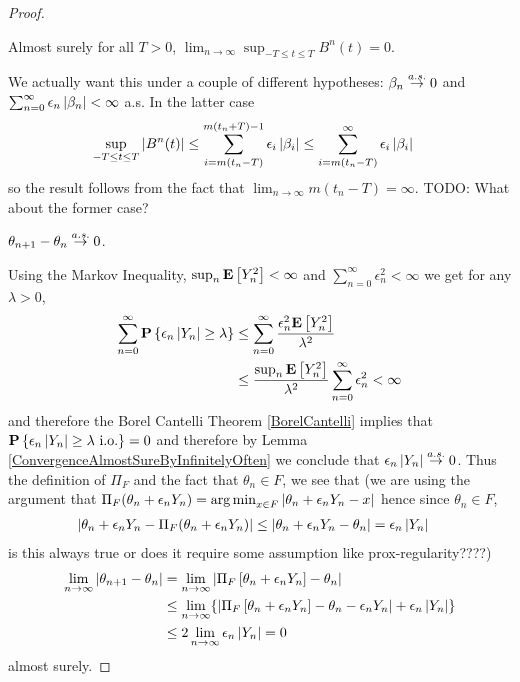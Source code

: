 \begin{proof}
\begin{clm}Almost surely for all $T > 0$, $\lim_{n \to \infty} \sup_{-T \leq t \leq T} B^n(t) = 0$.
\end{clm}

We actually want this under a couple of different hypotheses: $\beta_n \overset{a.s.}\to 0$ and $\sum_{n=0}^\infty \epsilon_n \left \vert \beta_n \right \vert < \infty$ a.s.  In the latter case 
\begin{align*}
\sup_{-T \leq t \leq T} \left \vert B^n(t) \right \vert &\leq \sum_{i=m(t_n -T)}^{m(t_n+T) -1} \epsilon_i \left \vert \beta_i \right \vert \leq \sum_{i=m(t_n -T)}^{\infty} \epsilon_i \left \vert \beta_i \right \vert 
\end{align*}
so the result follows from the fact that $\lim_{n \to \infty} m(t_n -T) = \infty$.  TODO: What about the former case?

\begin{clm}$\theta_{n+1} - \theta_n \overset{a.s.}\to 0$.
\end{clm}
Using the Markov Inequality, $\sup_n \textbf{E}\left[Y_n^2\right] < \infty$ and $\sum_{n=0}^\infty \epsilon_n^2 <\infty$ we get for any $\lambda > 0$,
\begin{align*}
\sum_{n=0}^\infty \textbf{P}\left \{\epsilon_n \left \vert Y_n \right \vert \geq \lambda \right \} &\leq 
\sum_{n=0}^\infty \frac{\epsilon_n^2 \textbf{E}\left[Y_n^2\right]}{\lambda^2} \\
&\leq \frac{\sup_n \textbf{E}\left[Y_n^2\right]}{\lambda^2} \sum_{n=0}^\infty \epsilon_n^2  < \infty
\end{align*}
and therefore the Borel Cantelli Theorem \ref{BorelCantelli} implies that $\textbf{P}\left \{\epsilon_n \left \vert Y_n \right \vert \geq \lambda \text{ i.o.} \right \} = 0$ and therefore by Lemma \ref{ConvergenceAlmostSureByInfinitelyOften} we conclude that $\epsilon_n \left \vert Y_n \right \vert \overset{a.s.}\to 0$.  Thus the definition of $\Pi_F$ and the fact that $\theta_n \in F$, we see that (we are using the argument that $\Pi_F(\theta_n + \epsilon_n Y_n) = \operatorname*{arg\,min}_{x \in F} \left \vert \theta_n + \epsilon_n Y_n - x \right \vert$ hence since $\theta_n \in F$,
\begin{align*}
\left \vert \theta_n + \epsilon_n Y_n - \Pi_F(\theta_n + \epsilon_n Y_n) \right \vert &\leq \left \vert \theta_n + \epsilon_n Y_n - \theta_n \right \vert = \epsilon_n \left \vert Y_n \right \vert
\end{align*}
is this always true or does it require some assumption like prox-regularity????)
\begin{align*}
\lim_{n \to \infty} \left \vert \theta_{n+1} - \theta_n  \right \vert &= \lim_{n \to \infty} \left \vert  \Pi_F \left[ \theta_n + \epsilon_n Y_n \right] - \theta_n  \right \vert \\
&\leq  \lim_{n \to \infty} \lbrace \left \vert  \Pi_F \left[ \theta_n + \epsilon_n Y_n \right] - \theta_n - \epsilon_n Y_n \right \vert + \epsilon_n \left \vert Y_n \right \vert \rbrace \\
&\leq 2 \lim_{n \to \infty} \epsilon_n \left \vert  Y_n \right \vert  = 0
\end{align*}
almost surely.



\end{proof}
